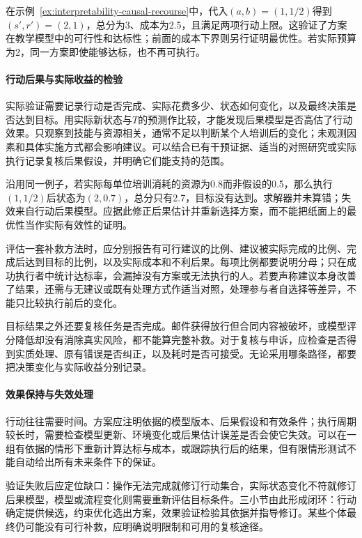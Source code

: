 在示例~\ref{ex:interpretability-causal-recourse}中，代入$(a,b)=(1,1/2)$得到$(s',r')=(2,1)$，总分为3、成本为2.5，且满足两项行动上限。这验证了方案在教学模型中的可行性和达标性；前面的成本下界则另行证明最优性。若实际预算为2，同一方案即使能够达标，也不再可执行。

\paragraph{行动后果与实际收益的检验}

实际验证需要记录行动是否完成、实际花费多少、状态如何变化，以及最终决策是否达到目标。用实际新状态与$T$的预测作比较，才能发现后果模型是否高估了行动效果。只观察到技能与资源相关，通常不足以判断某个人培训后的变化；未观测因素和具体实施方式都会影响建议。可以结合已有干预证据、适当的对照研究或实际执行记录复核后果假设，并明确它们能支持的范围。

沿用同一例子，若实际每单位培训消耗的资源为0.8而非假设的0.5，那么执行$(1,1/2)$后状态为$(2,0.7)$，总分只有2.7，目标没有达到。求解器并未算错；失效来自行动后果模型。应据此修正后果估计并重新选择方案，而不能把纸面上的最优性当作实际有效性的证明。

评估一套补救方法时，应分别报告有可行建议的比例、建议被实际完成的比例、完成后达到目标的比例，以及实际成本和不利后果。每项比例都要说明分母；只在成功执行者中统计达标率，会漏掉没有方案或无法执行的人。若要声称建议本身改善了结果，还需与无建议或既有处理方式作适当对照，处理参与者自选择等差异，不能只比较执行前后的变化。

目标结果之外还要复核任务是否完成。邮件获得放行但合同内容被破坏，或模型评分降低却没有消除真实风险，都不能算完整补救。对于复核与申诉，应检查是否得到实质处理、原有错误是否纠正，以及耗时是否可接受。无论采用哪条路径，都要把决策变化与实际收益分别记录。

\paragraph{效果保持与失效处理}

行动往往需要时间。方案应注明依据的模型版本、后果假设和有效条件；执行周期较长时，需要检查模型更新、环境变化或后果估计误差是否会使它失效。可以在一组有依据的情形下重新计算达标与成本，或跟踪执行后的结果，但有限情形测试不能自动给出所有未来条件下的保证。

验证失败后应定位缺口：操作无法完成就修订行动集合，实际状态变化不符就修订后果模型，模型或流程变化则需要重新评估目标条件。三小节由此形成闭环：行动确定提供候选，约束优化选出方案，效果验证检验其依据并指导修订。某些个体最终仍可能没有可行补救，应明确说明限制和可用的复核途径。


